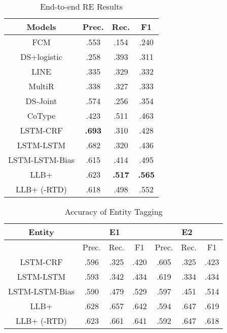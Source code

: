 \begin{table}[th!]
  \small
  \begin{center}
    \begin{tabular}{cccc}
      \hline
      \bf Models & \bf Prec. & \bf Rec. & \bf F1 \\
      \hline
      FCM & .553 & .154 & .240 \\
      DS+logistic & .258 & .393 & .311 \\
      LINE & .335 & .329 & .332 \\
      \hline
      MultiR & .338 & .327 & .333 \\
      DS-Joint & .574 & .256 & .354 \\
      CoType & .423 & .511 & .463 \\
      \hline
      LSTM-CRF & \textbf{.693} & .310 & .428 \\
      LSTM-LSTM & .682 & .320 & .436 \\
      LSTM-LSTM-Bias & .615 & .414 & .495 \\
      \hline
      LLB+ & .623 & \textbf{.517} & \textbf{.565} \\
      LLB+ (-RTD) & .618 & .498 & .552 \\
      \hline
    \end{tabular}
  \end{center}
  \caption{End-to-end RE Results}
  \label{tab:e2e}
\end{table}

\begin{table*}[th!]
  \small
  \begin{center}
  \caption{Accuracy of Entity Tagging}
  \label{tab:entity}
    \begin{tabular}{c|ccc|ccc}
      \hline
      Entity & \multicolumn{3}{|c|}{E1} & \multicolumn{3}{|c}{E2} \\
      \hline
      	& Prec. & Rec. & F1 & Prec. & Rec. & F1 \\
      \hline
      LSTM-CRF & .596 & .325 & .420 & .605 & .325 & .423 \\
      LSTM-LSTM & .593 & .342 & .434 & .619 & .334 & .434 \\
      LSTM-LSTM-Bias & .590 & .479 & .529 & .597 & .451 & .514 \\
      \hline
      LLB+  & .628 & .657 & .642 & .594 & .647 & .619 \\
      LLB+ (-RTD) & .623 & .661 & .641 & .592 & .647 & .618 \\
      \hline
    \end{tabular}
  \end{center}
\end{table*}

